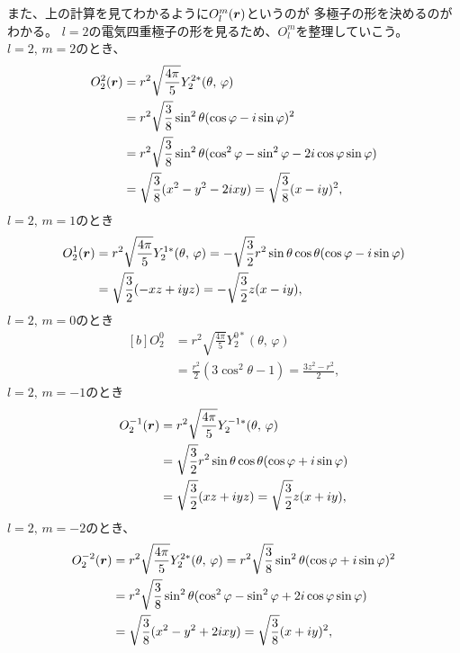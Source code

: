 \documentclass[../master.tex]{subfiles}
\begin{document}
また、上の計算を見てわかるように\(O_l^{m}(\vb*{r})\)というのが
多極子の形を決めるのがわかる。
\(l=2\)の電気四重極子の形を見るため、\(O_l^m\)を整理していこう。
\(l=2,\,m=2\)のとき、
\begin{equation}\begin{aligned}[b]
    O_2^{2}(\vb*{r})
    &= r^2\sqrt{\frac{4\pi}{5}}Y_2^{2*}(\theta,\,\varphi)\\
    &= r^2\sqrt{\frac{3}{8}} \sin^2\theta(\cos\varphi - i\sin\varphi)^2\\
    &= r^2\sqrt{\frac{3}{8}}\sin^2\theta(\cos^2\varphi-\sin^2\varphi - 2i\cos\varphi\sin\varphi)\\
    &=\sqrt{\frac{3}{8}}(x^2-y^2-2ixy)
    =\sqrt{\frac{3}{8}}(x-iy)^2,
\end{aligned}\end{equation}
\(l=2,\,m=1\)のとき
\begin{equation}\begin{aligned}[b]
    O_2^{1}(\vb*{r})
    &= r^2 \sqrt{\frac{4\pi}{5}}Y_2^{1*}(\theta,\,\varphi)
    = -\sqrt{\frac{3}{2}}r^2\sin\theta\cos\theta (\cos\varphi - i\sin\varphi)\\
    &= \sqrt{\frac{3}{2}}(-xz+iyz) = -\sqrt{\frac{3}{2}}z(x-iy),
\end{aligned}\end{equation}
\(l=2,\,m=0\)のとき
\begin{equation}\begin{aligned}[b]
    O_2^{0}
    &= r^2 \sqrt{\frac{4\pi}{5}}Y_2^{0*}(\theta,\,\varphi)\\
    &= \frac{r^2}{2}(3\cos^2\theta-1) = \frac{3z^2-r^2}{2},
\end{aligned}\end{equation}
\(l=2,\,m=-1\)のとき
\begin{equation}\begin{aligned}[b]
    O_2^{-1}(\vb*{r})
    &= r^2 \sqrt{\frac{4\pi}{5}}Y_2^{-1*}(\theta,\,\varphi)\\
    &= \sqrt{\frac{3}{2}}r^2\sin\theta\cos\theta (\cos\varphi + i\sin\varphi)\\
    &= \sqrt{\frac{3}{2}}(xz+iyz) = \sqrt{\frac{3}{2}}z(x+iy),
\end{aligned}\end{equation}
\(l=2,\,m=-2\)のとき、
\begin{equation}\begin{aligned}[b]
    O_2^{-2}(\vb*{r})
    &= r^2\sqrt{\frac{4\pi}{5}}Y_2^{2*}(\theta,\,\varphi)
    = r^2\sqrt{\frac{3}{8}} \sin^2\theta(\cos\varphi + i\sin\varphi)^2\\
    &= r^2\sqrt{\frac{3}{8}} \sin^2\theta(\cos^2\varphi-\sin^2\varphi + 2i\cos\varphi\sin\varphi)\\
    &=\sqrt{\frac{3}{8}}(x^2-y^2+2ixy) = \sqrt{\frac{3}{8}}(x+iy)^2,
\end{aligned}\end{equation}
\end{document}
